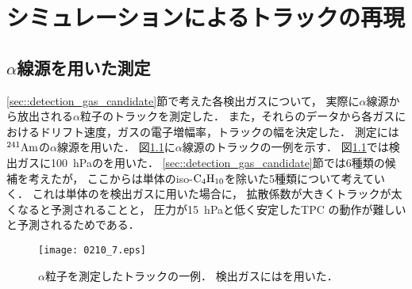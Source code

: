 \documentclass[../master]{subfiles}
\begin{document}
\chapter{シミュレーションによるトラックの再現}
\label{chap::simulation}
\section{\texorpdfstring{$\alpha$}{alpha}線源を用いた測定}
\ref{sec::detection_gas_candidate}節で考えた各検出ガスについて，
実際に$\alpha$線源から放出される$\alpha$粒子のトラックを測定した．
また，それらのデータから各ガスにおけるドリフト速度，ガスの電子増幅率，トラックの幅を決定した．
測定には${}^{241}{\rm Am}$の$\alpha$線源を用いた．
図\ref{fig::a_source_track}に$\alpha$線源のトラックの一例を示す．
図\ref{fig::a_source_track}では検出ガスに\SI{100}{\hecto\pascal}の\isoButaneHydro を用いた．
\ref{sec::detection_gas_candidate}節では6種類の候補を考えたが，
ここからは単体のiso-$\rm C_{4}H_{10}$を除いた5種類について考えていく．
これは単体の\isoButane を検出ガスに用いた場合に，
拡散係数が大きくトラックが太くなると予測されることと，
圧力が\SI{15}{\hecto\pascal}と低く安定したTPC の動作が難しいと予測されるためである．
\begin{figure}
  \centering
  \texttt{[image: 0210\_7.eps]}
  \caption[$\alpha$粒子を測定したトラックの一例．]
          {$\alpha$粒子を測定したトラックの一例．
          検出ガスには\isoButaneHydro を用いた．}
  \label{fig::a_source_track}
\end{figure}
\end{document}
